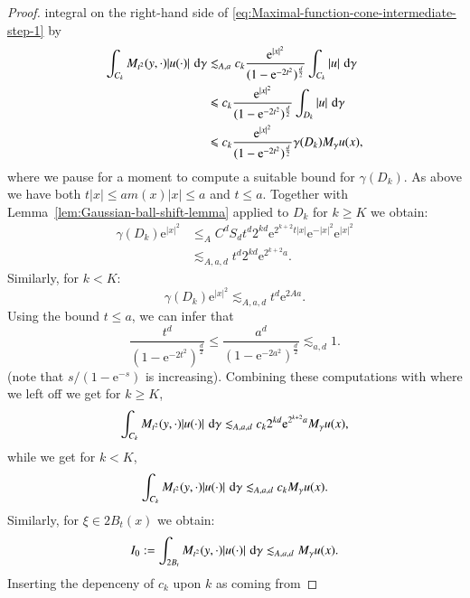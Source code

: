 \documentclass[preprint,12pt]{elsarticle}
\theoremstyle{remark}
\newcommand{\D}{\,\textup{d}}
\renewcommand{\leq}{\leqslant}
\renewcommand{\geq}{\geqslant}
\newcommand{\e}{\mathrm{e}} %
\begin{document}
\begin{proof}
  integral on the right-hand side of
  \eqref{eq:Maximal-function-cone-intermediate-step-1} by 
  \begin{align*}
    \int_{C_k}  M_{t^2}(y, \cdot) |u(\cdot)| \,\D\gamma & \lesssim_{A, a}
    c_k \frac{\e^{|x|^2}}{(1 - \e^{-2t^2})^{\frac{d}2}}   \int_{C_k}
    |u| \,\D\gamma\\ 
    &\leq c_k \frac {\e^{|x|^2}} {(1 -
      \e^{-2t^2})^{\frac{d}2}} \int_{D_k} |u| \,\D\gamma\\ 
    &\leq c_k \frac{\e^{|x|^2}}{(1 - \e^{-2t^2})^{\frac{d}2}} \gamma(D_k) M_\gamma u(x),
  \end{align*}
  where we pause for a moment to compute a suitable bound for $\gamma(D_k)$. As
  above we have both $t|x| \leq a m(x)|x| \leq a$ and $t \leq a$. Together with
  Lemma~\ref{lem:Gaussian-ball-shift-lemma} applied to $D_k$ for $k \geq K$ we
  obtain:
  \begin{align*}
    \gamma(D_k) \e^{|x|^2} &\leq_A C^d S_d t^d 2^{kd} \e^{2^{k + 2} t |x|}
    \e^{-|x|^2} \e^{|x|^2}\\
    &\lesssim_{A, a, d} t^d 2^{k d} \e^{2^{k + 2} a}.
  \end{align*}
  Similarly, for $k < K$:
  \begin{equation*}
    \gamma(D_k) \e^{|x|^2} \lesssim_{A, a, d} t^d \e^{2 A a}.
  \end{equation*}
  Using the bound $t\leq a$, we can infer that
 \begin{equation*}
    \frac{t^d}{(1 - \e^{-2t^2})^{\frac{d}2}} \leq \frac{a^d}{(1 -
      \e^{-2a^2})^{\frac{d}2}} \lesssim_{a, d} 1.
  \end{equation*}
  (note that $s/(1-\e^{-s})$ is increasing). Combining these computations with
 where we left off we get for $k \geq K$,
  \begin{equation*}
    \int_{C_k}  M_{t^2}(y, \cdot) |u(\cdot)| \,\D\gamma \lesssim_{A,
      a, d} c_k 2^{k d} \e^{2^{k + 2} a} M_\gamma u(x),
  \end{equation*}
  while we get for $k < K$,
  \begin{equation*}
    \int_{C_k}  M_{t^2}(y, \cdot) |u(\cdot)| \,\D\gamma \lesssim_{A,
      a, d} c_k M_\gamma u(x).
  \end{equation*} 
 Similarly, for $\xi \in 2B_t(x)$ we obtain:
   \begin{equation*}
    I_0 := \int_{2B_t}  M_{t^2}(y, \cdot) |u(\cdot)| \,\D\gamma \lesssim_{A,
      a, d} M_\gamma u(x).
  \end{equation*}
  Inserting the depenceny of $c_k$ upon $k$ as coming from

\end{proof}
\end{document}
